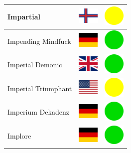 \documentclass[12pt, a4paper, twoside]{report}
\begin{document}
\begin{center}
\begin{longtable}{|p{5cm}|p{2cm}|p{2cm}|}
 Impartial                                                  & \includegraphics[width=1cm]{../img/flags/fo} &   \includegraphics[width=1cm]{../likes/m} \\ \hline
 Impending Mindfuck                                         & \includegraphics[width=1cm]{../img/flags/de} &   \includegraphics[width=1cm]{../likes/y} \\ \hline
 Imperial Demonic                                           & \includegraphics[width=1cm]{../img/flags/gb} &   \includegraphics[width=1cm]{../likes/y} \\ \hline
 Imperial Triumphant                                        & \includegraphics[width=1cm]{../img/flags/us} &   \includegraphics[width=1cm]{../likes/m} \\ \hline
 Imperium Dekadenz                                          & \includegraphics[width=1cm]{../img/flags/de} &   \includegraphics[width=1cm]{../likes/y} \\ \hline
 Implore                                                    & \includegraphics[width=1cm]{../img/flags/de} &   \includegraphics[width=1cm]{../likes/y} \\ \hline

\end{longtable}
\end{center}
\end{document}
